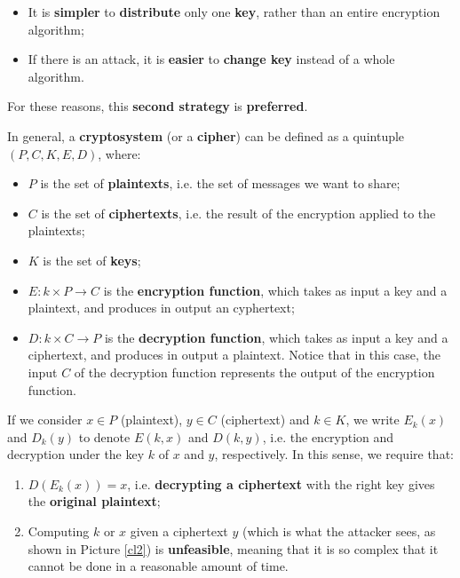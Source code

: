 \begin{enumerate}
    \begin{itemize}
        \item It is \textbf{simpler} to \textbf{distribute} only one \textbf{key}, rather than an entire encryption algorithm;
        \item If there is an attack, it is \textbf{easier} to \textbf{change key} instead of a whole algorithm.
    \end{itemize}

    For these reasons, this \textbf{second strategy} is \textbf{preferred}.
\end{enumerate}

In general, a \textbf{cryptosystem} (or a \textbf{cipher}) can be defined as a quintuple $(P,C,K,E,D)$, where:

\begin{itemize}
    \item $P$ is the set of \textbf{plaintexts}, i.e. the set of messages we want to share;
    \item $C$ is the set of \textbf{ciphertexts}, i.e. the result of the encryption applied to the plaintexts;
    \item $K$ is the set of \textbf{keys};
    \item $E: k \times P \xrightarrow{} C$ is the \textbf{encryption function}, which takes as input a key and a plaintext, and produces in output an cyphertext;
    \item $D: k \times C \xrightarrow{} P$ is the \textbf{decryption function}, which takes as input a key and a ciphertext, and produces in output a plaintext. Notice that in this case, the input $C$ of the decryption function represents the output of the encryption function.
\end{itemize}

If we consider $x \in P$ (plaintext), $y \in C$ (ciphertext) and $k \in K$, we write $E_k(x)$ and $D_k(y)$ to denote $E(k,x)$ and $D(k,y)$, i.e. the encryption and decryption under the key $k$ of $x$ and $y$, respectively. In this sense, we require that:

\begin{enumerate}
    \item $D(E_k(x)) = x$, i.e. \textbf{decrypting a ciphertext} with the right key gives the \textbf{original plaintext};
    \item Computing $k$ or $x$ given a ciphertext $y$ (which is what the attacker sees, as shown in Picture \ref{cl2}) is \textbf{unfeasible}, meaning that it is so complex that it cannot be done in a reasonable amount of time.
\end{enumerate}

